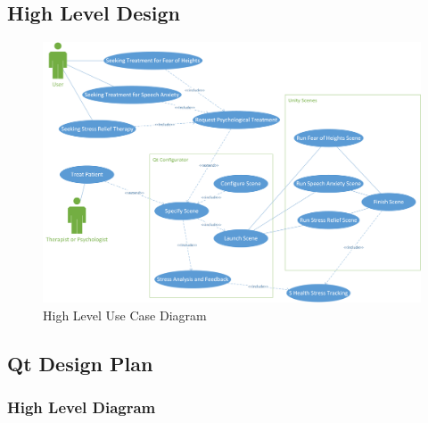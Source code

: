 \documentclass[a4paper,10pt]{article}
\begin{document}
	\subsection{High Level Design}
		\begin{figure}[H]
			\includegraphics[width=\linewidth,height=\paperheight,keepaspectratio]{highUseCase.png}
			\caption{High Level Use Case Diagram}
			\label{fig:highlevelusecase}
		\end{figure}
	\pagebreak
	\subsection{Qt Design Plan}
		\subsubsection{High Level Diagram}
		\pagebreak
\end{document}
